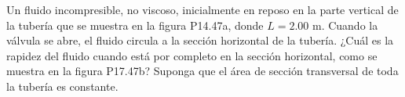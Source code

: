 \item Un fluido incompresible, no viscoso, inicialmente en reposo en la parte vertical de la tubería que se muestra en la figura P14.47a, donde $L = 2.00 \text{ m}$. Cuando la válvula se abre, el fluido circula a la sección horizontal de la tubería. ¿Cuál es la rapidez del fluido cuando está por completo en la sección horizontal, como se muestra en la figura P17.47b? Suponga que el área de sección transversal de toda la tubería es constante.
